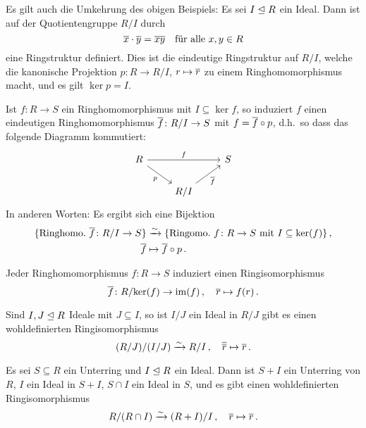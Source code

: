 Es gilt auch die Umkehrung des obigen Beispiels:
Es sei $I \mathrel{\trianglelefteq} R$ ein Ideal.
Dann ist auf der Quotientengruppe $R/I$ durch
\[
    \overline{x} \cdot \overline{y}
  = \overline{xy}
  \quad
  \text{für alle $x, y \in R$}
\]
eine Ringstruktur definiert.
Dies ist die eindeutige Ringstruktur auf $R/I$, welche die kanonische Projektion $p \colon R \to R/I$, $r \mapsto \overline{r}$ zu einem Ringhomomorphismus macht, und es gilt $\ker p = I$.

\begin{theorem}[Homomorphiesatz]
  Ist $f \colon R \to S$ ein Ringhomomorphismus mit $I \subseteq \ker f$, so induziert $f$ einen eindeutigen Ringhomomorphismus $\overline{f} \colon R/I \to S$ mit $f = \overline{f} \circ p$, d.h.\ so dass das folgende Diagramm kommutiert:
  \[
    \begin{tikzcd}
        R
        \arrow{rr}[above]{f}
        \arrow{dr}[below left]{p}
      & {}
      & S
      \\
        {}
      & R/I
        \arrow{ru}[below right]{\induced{f}}
      & {}
    \end{tikzcd}
  \]
  In anderen Worten:
  Es ergibt sich eine Bijektion
  \begin{align*}
                        \{ \text{Ringhomo.\ $\overline{f} \colon R/I \to S$} \}
    &\xrightarrow{\sim} \{ \text{Ringomo.\ $f \colon R \to S$ mit $I \subseteq \ker(f)$} \} \,,  \\
                        \overline{f}
    &\mapsto            \overline{f} \circ p \,.
  \end{align*}
\end{theorem}

\begin{corollary}[1.\ Isomorphiesatz]
  Jeder Ringhomomorphismus $f \colon R \to S$ induziert einen Ringisomorphismus
  \[
            \overline{f}
    \colon  R/{\ker(f)}
    \to     \operatorname{im}(f) \,,
    \quad   \overline{r}
    \mapsto f(r) \,.
  \]
\end{corollary}

\begin{corollary}[2.\ Isomorphiesatz]
  Sind $I, J \mathrel{\trianglelefteq} R$ Ideale mit $J \subseteq I$, so ist $I/J$ ein Ideal in $R/J$ gibt es einen wohldefinierten Ringisomorphismus
  \[
                        (R/J)/(I/J)
    \xrightarrow{\sim}  R/I \,,
    \quad               \overline{\overline{r}}
    \mapsto             \overline{r} \,.
  \]

\end{corollary}

\begin{corollary}[3.\ Isomorphiesatz]
  Es sei $S \subseteq R$ ein Unterring und $I \mathrel{\trianglelefteq} R$ ein Ideal.
  Dann ist $S + I$ ein Unterring von $R$, $I$ ein Ideal in $S + I$, $S \cap I$ ein Ideal in $S$, und es gibt einen wohldefinierten Ringisomorphismus
  \[
                        R/(R \cap I)
    \xrightarrow{\sim}  (R + I)/I \,,
    \quad               \overline{r}
    \mapsto             \overline{r} \,.
  \]
\end{corollary}


